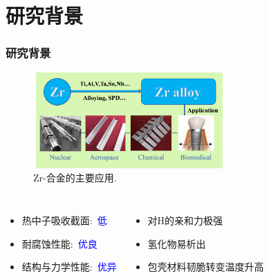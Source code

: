 \small
\section{研究背景}
\begin{frame}
	\frametitle{研究背景}
\begin{figure}[!ht]
\centering
\vspace*{-0.05in}
\includegraphics[height=1.45in,width=2.90in,viewport=0 0 430 230,clip]{Figures/Zr-Alloy_application.png}
\caption{\tiny \textrm{Zr}-合金的主要应用.}
\label{Fig:Zr-Alloy_Application}
\end{figure}
\vskip -30pt
  \begin{columns}
\begin{itemize}
	\item 热中子吸收截面:~\textcolor{blue}{低}
	\item 耐腐蚀性能:~\textcolor{blue}{优良}
	\item 结构与力学性能:~\textcolor{blue}{优异}
\end{itemize}
\begin{itemize}
	\item 对\textrm{H}的亲和力极强%
	\item 氢化物易析出%
	\item 包壳材料韧脆转变温度升高
\end{itemize}
  \end{columns}
\end{frame}

